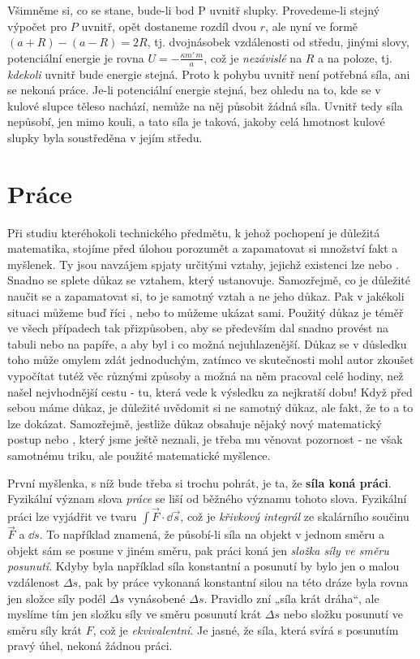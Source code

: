 {    Všimněme si, co se stane, bude-li bod P uvnitř slupky. Provedeme-li stejný výpočet pro \(P\) 
    uvnitř, opět dostaneme rozdíl dvou \(r\), ale nyní ve formě \((a + R) - (a - R) =2R\), tj. 
    dvojnásobek vzdálenosti od středu, jinými slovy, potenciální energie je rovna \(U = - 
    \frac{\kappa m'\,m}{a}\), což je \emph{nezávislé} na \(R\) a na poloze, tj. \emph{kdekoli} 
    uvnitř bude energie stejná. Proto k pohybu uvnitř není potřebná síla, ani se nekoná práce. 
    Je-li potenciální energie stejná, bez ohledu na to, kde se v kulové slupce těleso nachází, 
    nemůže na něj působit žádná síla. Uvnitř tedy síla nepůsobí, jen mimo kouli, a tato síla je 
    taková, jakoby celá hmotnost kulové slupky byla soustředěna v jejím středu.

  \section{Práce}
    Při studiu kteréhokoli technického předmětu, k jehož pochopení je důležitá matematika, stojíme 
    před úlohou porozumět a zapamatovat si množství fakt a myšlenek. Ty jsou navzájem spjaty 
    určitými vztahy, jejichž existenci lze  nebo . Snadno se splete důkaz se 
    vztahem, který ustanovuje. Samozřejmě, co je důležité naučit se a zapamatovat si, to je samotný 
    vztah a ne jeho důkaz. Pak v jakékoli situaci můžeme buď říci , nebo to můžeme ukázat sami. Použitý důkaz je téměř ve všech případech tak přizpůsoben, 
    aby se především dal snadno provést na tabuli nebo na papíře, a aby byl i co možná 
    nejuhlazenější. Důkaz se v důsledku toho může omylem zdát jednoduchým, zatímco ve skutečnosti 
    mohl autor zkoušet vypočítat tutéž věc různými způsoby a možná na něm pracoval celé hodiny, než 
    našel nejvhodnější cestu - tu, která vede k výsledku za nejkratší dobu! Když před sebou máme 
    důkaz, je důležité uvědomit si ne samotný důkaz, ale fakt, že to a to lze dokázat. Samozřejmě, 
    jestliže důkaz obsahuje nějaký nový matematický postup nebo , který jsme ještě 
    neznali, je třeba mu věnovat pozornost - ne však samotnému triku, ale použité matematické 
    myšlence.

    První myšlenka, s níž bude třeba si trochu pohrát, je ta, že \textbf{síla koná práci}. 
    Fyzikální význam slova \emph{práce} se liší od běžného významu tohoto slova. Fyzikální práci 
    lze vyjádřit ve tvaru \(\int\vec{F}\cdot\dd{\vec{s}}\), což je \emph{křivkový integrál} ze 
    skalárního součinu \(\vec{F}\) a \(\dd{s}\). To například znamená, že působí-li síla na objekt 
    v jednom směru a objekt sám se posune v jiném směru, pak práci koná jen \emph{složka síly ve 
    směru posunutí}. Kdyby byla například síla konstantní a posunutí by bylo jen o malou vzdálenost 
    \(\Delta s\), pak by práce vykonaná konstantní silou na této dráze byla rovna jen složce síly 
    podél \(\Delta s\) vynásobené \(\Delta s\). Pravidlo zní „síla krát dráha“, ale myslíme tím jen 
    složku síly ve směru posunutí krát \(\Delta s\) nebo složku posunutí ve směru síly krát 
    \(F\), což je \emph{ekvivalentní}. Je jasné, že síla, která svírá s posunutím pravý úhel, 
    nekoná žádnou práci.
    
}
